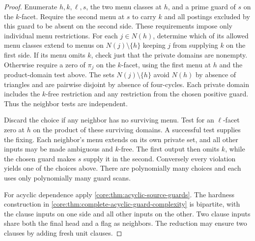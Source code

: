 \begin{proof}
Enumerate $h,k,\ell,s$, the two menu classes at $h$, and a prime guard of
$s$ on the $k$-facet. Require the second menu at $s$ to carry $k$ and
all postings excluded by this guard to be absent on the second side.
These requirements impose only individual menu restrictions. For each
$j\in N(h)$, determine which of its allowed menu classes extend to
menus on $N(j)\setminus\{h\}$ keeping $j$ from supplying $k$ on the
first side. If its menu omits $k$, check just that the private domains
are nonempty. Otherwise require a zero of $\pi_j$ on the $k$-facet,
using the first menu at $h$ and the product-domain test above.
The sets $N(j)\setminus\{h\}$ avoid $N(h)$ by absence of triangles
and are pairwise disjoint by absence of four-cycles. Each private domain
includes the $k$-free restriction and any restriction from the chosen
positive guard. Thus the neighbor tests are independent.

Discard the choice if any neighbor has no surviving menu. Test for an
$\ell$-facet zero at $h$ on the product of these surviving domains.
A successful test supplies the fixing. Each neighbor's menu extends on
its own private set, and all other inputs may be made ambiguous and
$k$-free. The first output then omits $k$, while the chosen guard makes
$s$ supply it in the second. Conversely every violation yields one of
the choices above. There are polynomially many choices and each uses
only polynomially many guard scans.

For acyclic dependence apply \cref{core:thm:acyclic-source-guards}.
The hardness construction in
\cref{core:thm:complete-acyclic-guard-complexity} is bipartite, with
the clause inputs on one side and all other inputs on the other.
Two clause inputs share both the final head and a flag as neighbors.
The reduction may ensure two clauses by adding fresh unit clauses.
\end{proof}
